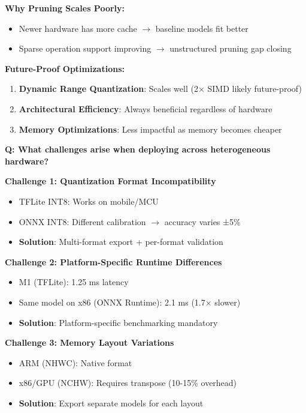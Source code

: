 \documentclass[10pt, a4paper]{article}
\begin{document}
\textbf{Why Pruning Scales Poorly:}
\begin{itemize}
    \item Newer hardware has more cache $\rightarrow$ baseline models fit better
    \item Sparse operation support improving $\rightarrow$ unstructured pruning gap closing
\end{itemize}

\textbf{Future-Proof Optimizations:}
\begin{enumerate}
    \item \textbf{Dynamic Range Quantization}: Scales well (2× SIMD likely future-proof)
    \item \textbf{Architectural Efficiency}: Always beneficial regardless of hardware
    \item \textbf{Memory Optimizations}: Less impactful as memory becomes cheaper
\end{enumerate}

\textbf{Q: What challenges arise when deploying across heterogeneous hardware?}

\textbf{Challenge 1: Quantization Format Incompatibility}
\begin{itemize}
    \item TFLite INT8: Works on mobile/MCU
    \item ONNX INT8: Different calibration $\rightarrow$ accuracy varies ±5\%
    \item \textbf{Solution}: Multi-format export + per-format validation
\end{itemize}

\textbf{Challenge 2: Platform-Specific Runtime Differences}
\begin{itemize}
    \item M1 (TFLite): 1.25 ms latency
    \item Same model on x86 (ONNX Runtime): 2.1 ms (1.7× slower)
    \item \textbf{Solution}: Platform-specific benchmarking mandatory
\end{itemize}

\textbf{Challenge 3: Memory Layout Variations}
\begin{itemize}
    \item ARM (NHWC): Native format
    \item x86/GPU (NCHW): Requires transpose (10-15\% overhead)
    \item \textbf{Solution}: Export separate models for each layout
\end{itemize}
\end{document}
